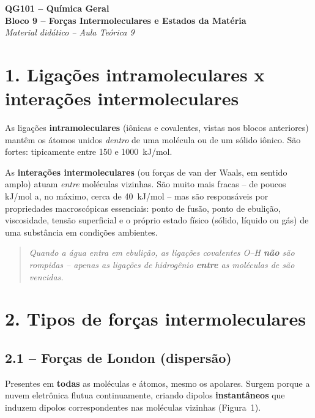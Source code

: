 \documentclass[11pt,a4paper]{article}
\begin{document}
\begin{center}
  {\LARGE\bfseries QG101 -- Química Geral}\\[4pt]
  {\large\bfseries Bloco 9 -- Forças Intermoleculares e Estados da Matéria}\\[2pt]
  \textit{Material didático -- Aula Teórica 9}
\end{center}

\bigskip

\section*{1. Ligações intramoleculares x interações intermoleculares}

As ligações \textbf{intramoleculares} (iônicas e covalentes, vistas nos blocos
anteriores) mantêm os átomos unidos \emph{dentro} de uma molécula ou de um
sólido iônico. São fortes: tipicamente entre 150 e 1000~kJ/mol.

As \textbf{interações intermoleculares} (ou forças de van der Waals, em
sentido amplo) atuam \emph{entre} moléculas vizinhas. São muito mais fracas
-- de poucos kJ/mol a, no máximo, cerca de 40~kJ/mol -- mas são responsáveis
por propriedades macroscópicas essenciais: ponto de fusão, ponto de
ebulição, viscosidade, tensão superficial e o próprio estado físico
(sólido, líquido ou gás) de uma substância em condições ambientes.

\begin{quote}
\textit{Quando a água entra em ebulição, as ligações covalentes O--H
\textbf{não} são rompidas -- apenas as ligações de hidrogênio
\textbf{entre} as moléculas de  são vencidas.}
\end{quote}

\section*{2. Tipos de forças intermoleculares}

\subsection*{2.1 -- Forças de London (dispersão)}

Presentes em \textbf{todas} as moléculas e átomos, mesmo os apolares. Surgem
porque a nuvem eletrônica flutua continuamente, criando dipolos
\textbf{instantâneos} que induzem dipolos correspondentes nas moléculas
vizinhas (Figura~1).
\end{document}
